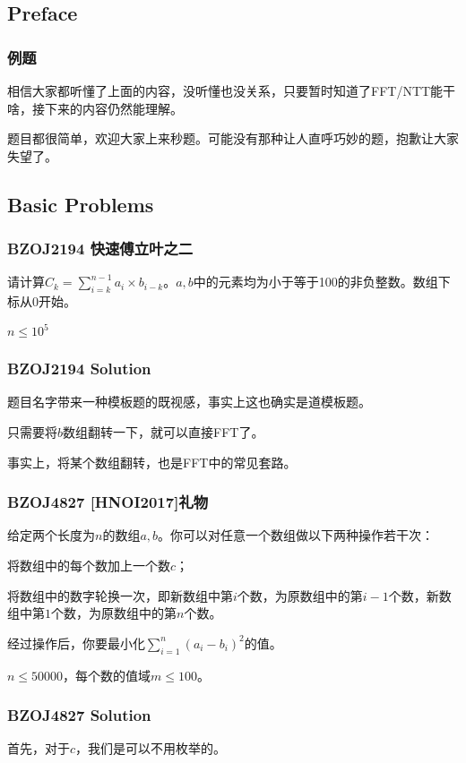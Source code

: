 \documentclass[10pt]{beamer}
\begin{document}
\begin{spacing}{1.2}
		\subsection{Preface}
		\begin{frame}
			\frametitle{例题}

			相信大家都听懂了上面的内容，没听懂也没关系，只要暂时知道了FFT/NTT能干啥，接下来的内容仍然能理解。 \pause

			题目都很简单，欢迎大家上来秒题。\pause 可能没有那种让人直呼巧妙的题，抱歉让大家失望了。

		\end{frame}
		\subsection{Basic Problems}
		\begin{frame}
			\frametitle{BZOJ2194 快速傅立叶之二}

			请计算$\displaystyle C_k=\sum_{i=k}^{n-1}a_i \times b_{i-k}$。$a,b$中的元素均为小于等于100的非负整数。数组下标从$0$开始。 \pause

			$n \le 10^5$
		\end{frame}
		\begin{frame}
			\frametitle{BZOJ2194 Solution}

			题目名字带来一种模板题的既视感，事实上这也确实是道模板题。 \pause

			只需要将$b$数组翻转一下，就可以直接FFT了。 \pause

			事实上，将某个数组翻转，也是FFT中的常见套路。

		\end{frame}
		\begin{frame}
			\frametitle{BZOJ4827 [HNOI2017]礼物}

			给定两个长度为$n$的数组$a,b$。你可以对任意一个数组做以下两种操作若干次： \pause

			将数组中的每个数加上一个数$c$；

			将数组中的数字轮换一次，即新数组中第$i$个数，为原数组中的第$i-1$个数，新数组中第$1$个数，为原数组中的第$n$个数。 \pause

			经过操作后，你要最小化$\displaystyle\sum_{i=1}^{n}(a_i-b_i)^2$的值。 \pause

			$n \le 50000$，每个数的值域$m \le 100$。

		\end{frame}
		\begin{frame}
			\frametitle{BZOJ4827 Solution}

			首先，对于$c$，我们是可以不用枚举的。 \pause


\end{frame}
\end{spacing}
\end{document}
